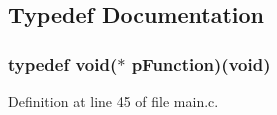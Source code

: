 \subsection{\-Typedef \-Documentation}
\hypertarget{group___flying_f3_b_l_ga9227bf1f1a9c633a0cc9ca50cc761c1a}{
\subsubsection[{p\-Function}]{\setlength{\rightskip}{0pt plus 5cm}typedef void($\ast$ {\bf p\-Function})(void)}}\label{group___flying_f3_b_l_ga9227bf1f1a9c633a0cc9ca50cc761c1a}


\-Definition at line 45 of file main.\-c.




